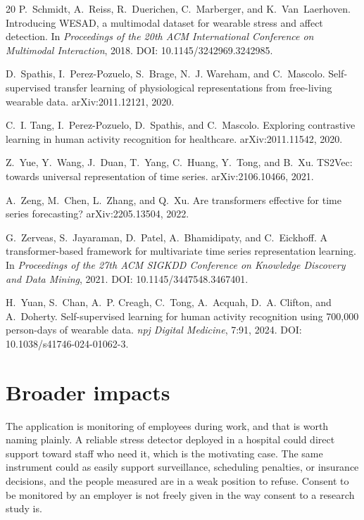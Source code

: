 \documentclass{article}
\begin{document}
\begin{thebibliography}{20}
P.~Schmidt, A.~Reiss, R.~Duerichen, C.~Marberger, and K.~Van~Laerhoven.
\newblock Introducing WESAD, a multimodal dataset for wearable stress and
  affect detection.
\newblock In \emph{Proceedings of the 20th ACM International Conference on
  Multimodal Interaction}, 2018.
\newblock DOI: 10.1145/3242969.3242985.

D.~Spathis, I.~Perez-Pozuelo, S.~Brage, N.~J. Wareham, and C.~Mascolo.
\newblock Self-supervised transfer learning of physiological representations
  from free-living wearable data.
\newblock arXiv:2011.12121, 2020.

C.~I. Tang, I.~Perez-Pozuelo, D.~Spathis, and C.~Mascolo.
\newblock Exploring contrastive learning in human activity recognition for
  healthcare.
\newblock arXiv:2011.11542, 2020.

Z.~Yue, Y.~Wang, J.~Duan, T.~Yang, C.~Huang, Y.~Tong, and B.~Xu.
\newblock TS2Vec: towards universal representation of time series.
\newblock arXiv:2106.10466, 2021.

A.~Zeng, M.~Chen, L.~Zhang, and Q.~Xu.
\newblock Are transformers effective for time series forecasting?
\newblock arXiv:2205.13504, 2022.

G.~Zerveas, S.~Jayaraman, D.~Patel, A.~Bhamidipaty, and C.~Eickhoff.
\newblock A transformer-based framework for multivariate time series
  representation learning.
\newblock In \emph{Proceedings of the 27th ACM SIGKDD Conference on Knowledge
  Discovery and Data Mining}, 2021.
\newblock DOI: 10.1145/3447548.3467401.

H.~Yuan, S.~Chan, A.~P. Creagh, C.~Tong, A.~Acquah, D.~A. Clifton,
  and A.~Doherty.
\newblock Self-supervised learning for human activity recognition
  using 700,000 person-days of wearable data.
\newblock \emph{npj Digital Medicine}, 7:91, 2024.
\newblock DOI: 10.1038/s41746-024-01062-3.

\end{thebibliography}

\newpage

\appendix

\section{Broader impacts}

The application is monitoring of employees during work, and that is worth
naming plainly. A reliable stress detector deployed in a hospital could direct
support toward staff who need it, which is the motivating case. The same
instrument could as easily support surveillance, scheduling penalties, or
insurance decisions, and the people measured are in a weak position to refuse.
Consent to be monitored by an employer is not freely given in the way consent
to a research study is.
\end{document}
